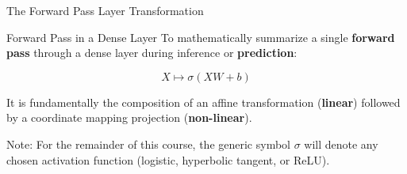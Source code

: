\begin{frame}{The Forward Pass Layer Transformation}
	
	\begin{block}{Forward Pass in a Dense Layer}
		To mathematically summarize a single \textbf{forward pass} through a dense layer during inference or \textbf{prediction}:
		
		\begin{equation*}
			X \mapsto \sigma\left(X W + b\right)
		\end{equation*} 
		
		It is fundamentally the composition of an affine transformation (\textbf{linear}) followed by a coordinate mapping projection (\textbf{non-linear}).		
	\end{block}
	
	\vspace{0.3cm}
	
	Note: For the remainder of this course, the generic symbol $\sigma$ will denote any chosen activation function (logistic, hyperbolic tangent, or ReLU).
	
\end{frame}